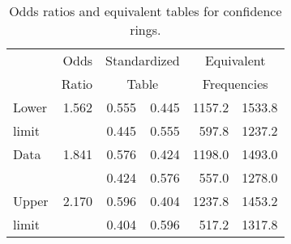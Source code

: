 \begin{table}[htb]
\caption{Odds ratios and equivalent tables for confidence rings.}\label{tab:berkodds}
 \begin{center}
\begin{tabular}{lr|rr|rr}
\hline
   &      Odds    & \multicolumn{2}{c|}{Standardized} & \multicolumn{2}{c}{Equivalent}  \\
   &      Ratio   & \multicolumn{2}{c|}{Table}   &  \multicolumn{2}{c}{Frequencies} \\
\hline
Lower &   1.562   &    0.555 & 0.445   &  1157.2 &  1533.8 \\
limit &           &    0.445 & 0.555   &   597.8 &  1237.2 \\[2ex]

Data  &   1.841   &    0.576 & 0.424   &  1198.0 &  1493.0 \\
      &           &    0.424 & 0.576   &   557.0 &  1278.0 \\[2ex]

Upper &   2.170   &    0.596 & 0.404   &  1237.8 &  1453.2 \\
limit &           &    0.404 & 0.596   &   517.2 &  1317.8 \\
\hline
\end{tabular}
\end{center}
\end{table}